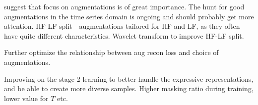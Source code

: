 \documentclass[../../thesis.tex]{subfiles}
\begin{document}
\cite{morningstar2024augmentations} suggest that focus on augmentations is of great importance. The hunt for good augmentations in the time series domain is ongoing and should probably get more attention.\newline
HF-LF split - augmentations tailored for HF and LF, as they often have quite different characteristics.\newline
Wavelet transform to improve HF-LF split.\newline

Further optimize the relationship between aug recon loss and choice of augmentations.\newline

Improving on the stage 2 learning to better handle the expressive representations, and be able to create more diverse samples. Higher masking ratio during training, lower value for $T$ etc.
\end{document}
